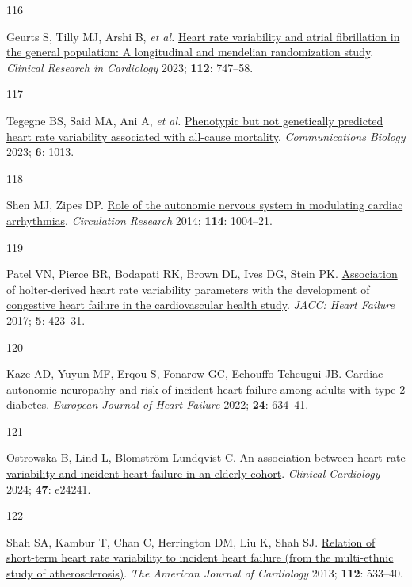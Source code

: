\documentclass[
  letterpaper,
  headsepline=true,
  open=any]{scrbook}
\newlength{\cslhangindent}
\newlength{\csllabelwidth}
\newlength{\cslentryspacingunit} %
\newenvironment{CSLReferences}[2] %
 {%
  \setlength{\parindent}{0pt}
  \ifodd #1
  \let\oldpar\par
  \def\par{\hangindent=\cslhangindent\oldpar}
  \fi
  \setlength{\parskip}{#2\cslentryspacingunit}
 }%
 {}
\newcommand{\CSLLeftMargin}[1]{\parbox[t]{\csllabelwidth}{#1}}
\newcommand{\CSLRightInline}[1]{\parbox[t]{\linewidth - \csllabelwidth}{#1}\break}
\begin{document}
\begin{CSLReferences}{0}{0}
\leavevmode{}%
\CSLLeftMargin{116 }%
\CSLRightInline{Geurts S, Tilly MJ, Arshi B, \emph{et al.}
\href{https://doi.org/10.1007/s00392-022-02072-5}{Heart rate variability
and atrial fibrillation in the general population: A longitudinal and
mendelian randomization study}. \emph{Clinical Research in Cardiology}
2023; \textbf{112}: 747--58.}

\leavevmode{}%
\CSLLeftMargin{117 }%
\CSLRightInline{Tegegne BS, Said MA, Ani A, \emph{et al.}
\href{https://doi.org/10.1038/s42003-023-05376-y}{Phenotypic but not
genetically predicted heart rate variability associated with all-cause
mortality}. \emph{Communications Biology} 2023; \textbf{6}: 1013.}

\leavevmode{}%
\CSLLeftMargin{118 }%
\CSLRightInline{Shen MJ, Zipes DP.
\href{https://doi.org/10.1161/CIRCRESAHA.113.302549}{Role of the
autonomic nervous system in modulating cardiac arrhythmias}.
\emph{Circulation Research} 2014; \textbf{114}: 1004--21.}

\leavevmode{}%
\CSLLeftMargin{119 }%
\CSLRightInline{Patel VN, Pierce BR, Bodapati RK, Brown DL, Ives DG,
Stein PK. \href{https://doi.org/10.1016/j.jchf.2016.12.015}{Association
of holter-derived heart rate variability parameters with the development
of congestive heart failure in the cardiovascular health study}.
\emph{JACC: Heart Failure} 2017; \textbf{5}: 423--31.}

\leavevmode{}%
\CSLLeftMargin{120 }%
\CSLRightInline{Kaze AD, Yuyun MF, Erqou S, Fonarow GC,
Echouffo-Tcheugui JB. \href{https://doi.org/10.1002/ejhf.2432}{Cardiac
autonomic neuropathy and risk of incident heart failure among adults
with type 2 diabetes}. \emph{European Journal of Heart Failure} 2022;
\textbf{24}: 634--41.}

\leavevmode{}%
\CSLLeftMargin{121 }%
\CSLRightInline{Ostrowska B, Lind L, Blomström-Lundqvist C.
\href{https://doi.org/10.1002/clc.24241}{An association between heart
rate variability and incident heart failure in an elderly cohort}.
\emph{Clinical Cardiology} 2024; \textbf{47}: e24241.}

\leavevmode{}%
\CSLLeftMargin{122 }%
\CSLRightInline{Shah SA, Kambur T, Chan C, Herrington DM, Liu K, Shah
SJ. \href{https://doi.org/10.1016/j.amjcard.2013.04.018}{Relation of
short-term heart rate variability to incident heart failure (from the
multi-ethnic study of atherosclerosis)}. \emph{The American Journal of
Cardiology} 2013; \textbf{112}: 533--40.}


\end{CSLReferences}
\end{document}
